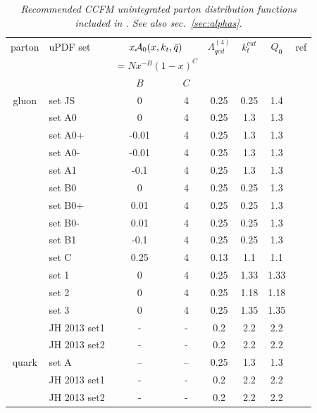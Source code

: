 \documentclass[11pt]{article} \usepackage{mystyle-new}
\newcommand{\Pmax}{\bar{q}}
\newcommand{\kt}{k_{t}}
\def\CASCADE{{\sc Cascade}}
\begin{document}
\begin{table}[htp]
\begin{center}
\begin{tabular}{|c|l|c|c|c|c|c|c|}
\hline 
parton & uPDF set & \multicolumn{2}{|c|}{$x{\cal A}_0(x,k_t,\Pmax)$}& $\Lambda^{(4)}_{qcd}$ & $\kt^{cut}$ & $Q_0$ &ref \\ 
& & \multicolumn{2}{|c|}{$= Nx^{-B}(1-x)^C$}& & & & \\
\hline
 & & $B$ & $C$ & & & & \\
\hline
gluon  & set JS  &0 &4& 0.25 & 0.25 & 1.4 & \protect\cite{jung-dis04} \\
          & set A0  &0 &4& 0.25 & 1.3 & 1.3 & \protect\cite{jung-dis04} \\
          & set A0+  & -0.01&4&0.25  & 1.3  & 1.3 &  \protect\cite{jung-dis04} \\
          & set A0- & -0.01&4&0.25  & 1.3  & 1.3 &  \protect\cite{jung-dis04}\\ 
          & set A1 & -0.1&4&0.25  & 1.3  & 1.3 &  \protect\cite{jung-dis04}\\ 
          & set B0 & 0&4& 0.25 &  0.25 & 1.3 &  \protect\cite{jung-dis04}\\
         & set B0+&0.01&4 &0.25  & 0.25  &1.3 &  \protect\cite{jung-dis04}\\
         & set B0-&  0.01&4&0.25  & 0.25 & 1.3 & \protect\cite{jung-dis04}\\ 
         & set B1& -0.1 &4&0.25  & 0.25 & 1.3 & \protect\cite{jung-dis04}\\ 
 & set C & 0.25&4& 0.13 & 1.1 & 1.1 &  \protect\cite{jung-dis07}\\  
 & set 1 & 0& 4& 0.25 & 1.33&1.33 & \protect\cite{jung-dis03}\\  
 & set 2 & 0&4& 0.25 & 1.18 & 1.18&  \protect\cite{jung-dis03}\\  
 & set 3&0& 4& 0.25 & 1.35&1.35 & \protect\cite{jung-dis03}\\  
  & JH 2013 set1 & - & - & 0.2 & 2.2 & 2.2 & \protect\cite{Hautmann:2013tba} \\
  & JH 2013 set2 & - & - & 0.2 & 2.2 & 2.2& \protect\cite{Hautmann:2013tba} \\
\hline
quark  & set A  & -- &--& 0.25 & 1.3  & 1.3 &  \\
  & JH 2013 set1 & - & - & 0.2 & 2.2 & 2.2& \protect\cite{Hautmann:2013tba} \\
  & JH 2013 set2 & - & - & 0.2 & 2.2 & 2.2& \protect\cite{Hautmann:2013tba} \\
\hline
\end{tabular}
\caption{\it Recommended CCFM unintegrated parton distribution functions included in \protect\CASCADE . See also sec.~\protect\ref{sec:alphas}.}
\end{center}
\label{updfs}
\end{table}%
\end{document}
